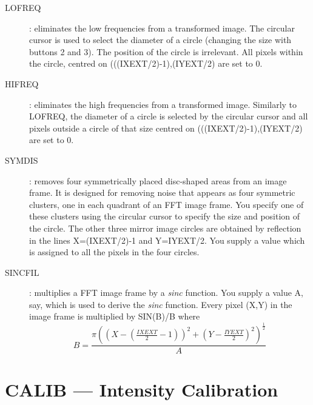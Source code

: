 \begin{enumerate}
\begin{description}
\item [LOFREQ]:
eliminates the low frequencies from a transformed image.
The circular cursor is used to select the diameter of a circle (changing the
size with buttons 2 and 3).
The position of the circle is irrelevant.
All pixels within the circle, centred on (((IXEXT/2)-1),(IYEXT/2) are set to 0.
\item [HIFREQ]:
eliminates the high frequencies from a transformed image.
Similarly to LOFREQ, the diameter of a circle is selected by the circular cursor
and all pixels outside a circle of that size centred on (((IXEXT/2)-1),(IYEXT/2)
are set to 0.
\item [SYMDIS]:
removes four symmetrically placed disc-shaped areas from an image frame.
It is designed for removing noise that appears as four symmetric clusters, one
in each quadrant of an FFT image frame.
You specify one of these clusters using the circular cursor to specify the size
and position of the circle.
The other three mirror image circles are obtained by reflection in the lines
X=(IXEXT/2)-1 and Y=IYEXT/2.
You supply a value which is assigned to all the pixels in the four circles.
\item [SINCFIL]:
multiplies a FFT image frame by a {\em sinc} function.
You supply a value A, say, which is used to derive the {\em sinc} function.
Every pixel (X,Y) in the image frame is multiplied by SIN(B)/B where
\begin{displaymath}
B=\frac {\pi( (X-(\frac{IXEXT}{2}-1))^{2} + 
(Y-\frac{IYEXT}{2})^{2} )^{\frac{1}{2}}} {A}
\end{displaymath}
\end{description}
\end{enumerate}

\section {CALIB --- Intensity Calibration}

